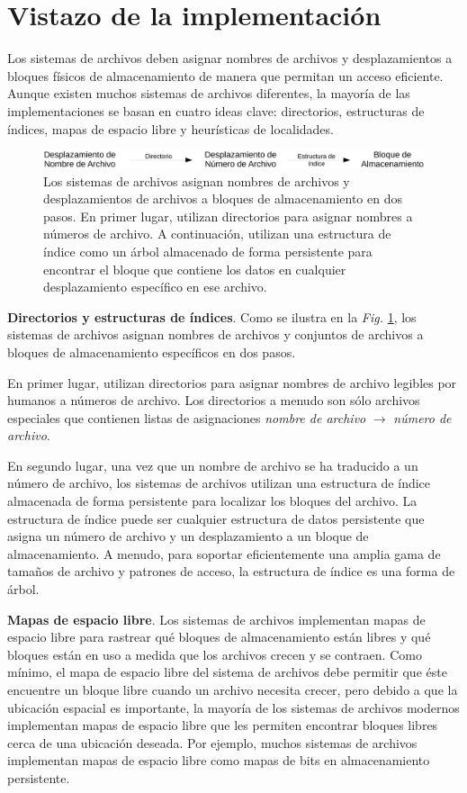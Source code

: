 \documentclass[10pt]{book}
\begin{document}
\section{Vistazo de la implementación}
Los sistemas de archivos deben asignar nombres de archivos y desplazamientos a bloques físicos de almacenamiento de manera que permitan un acceso eficiente. Aunque existen muchos sistemas de archivos diferentes, la mayoría de las implementaciones se basan en cuatro ideas clave: directorios, estructuras de índices, mapas de espacio libre y heurísticas de localidades.

\begin{figure}[tbhp]
\centerline{\includegraphics[scale=0.65]{img/fig1301}}
\caption{Los sistemas de archivos asignan nombres de archivos y desplazamientos de archivos a bloques de almacenamiento en dos pasos. En primer lugar, utilizan directorios para asignar nombres a números de archivo. A continuación, utilizan una estructura de índice como un árbol almacenado de forma persistente para encontrar el bloque que contiene los datos en cualquier desplazamiento específico en ese archivo.}
\label{fig1301}
\end{figure}

\textbf{Directorios y estructuras de índices}. Como se ilustra en la \textit{Fig.} \ref{fig1301}, los sistemas de archivos asignan nombres de archivos y conjuntos de archivos a bloques de almacenamiento específicos en dos pasos.

En primer lugar, utilizan directorios para asignar nombres de archivo legibles por humanos a números de archivo. Los directorios a menudo son sólo archivos especiales que contienen listas de asignaciones \textit{nombre de archivo} $\rightarrow$ \textit{número de archivo}.

En segundo lugar, una vez que un nombre de archivo se ha traducido a un número de archivo, los sistemas de archivos utilizan una estructura de índice almacenada de forma persistente para localizar los bloques del archivo. La estructura de índice puede ser cualquier estructura de datos persistente que asigna un número de archivo y un desplazamiento a un bloque de almacenamiento. A menudo, para soportar eficientemente una amplia gama de tamaños de archivo y patrones de acceso, la estructura de índice es una forma de árbol.

\textbf{Mapas de espacio libre}. Los sistemas de archivos implementan mapas de espacio libre para rastrear qué bloques de almacenamiento están libres y qué bloques están en uso a medida que los archivos crecen y se contraen. Como mínimo, el mapa de espacio libre del sistema de archivos debe permitir que éste encuentre un bloque libre cuando un archivo necesita crecer, pero debido a que la ubicación espacial es importante, la mayoría de los sistemas de archivos modernos implementan mapas de espacio libre que les permiten encontrar bloques libres cerca de una ubicación deseada. Por ejemplo, muchos sistemas de archivos implementan mapas de espacio libre como mapas de bits en almacenamiento persistente.
\end{document}
